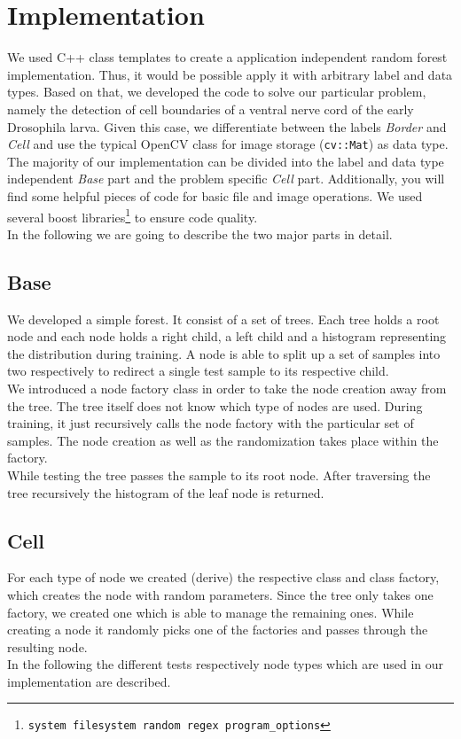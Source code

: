 \section{Implementation}
\label{sec:implementation}


We used C++ class templates to create a application independent random forest implementation. Thus, it would be possible apply it with arbitrary label and data types. Based on that, we developed the code to solve our particular problem, namely the detection of cell boundaries of a ventral nerve cord of the early Drosophila larva. Given this case, we differentiate between the labels \emph{Border} and \emph{Cell} and use the typical OpenCV class for image storage (\texttt{cv::Mat}) as data type.\\
The majority of our implementation can be divided into the label and data type independent \emph{Base} part and the problem specific \emph{Cell} part. Additionally, you will find some helpful pieces of code for basic file and image operations. We used several boost libraries\footnote{\texttt{system filesystem random regex program\_options}} to ensure code quality.\\
In the following we are going to describe the two major parts in detail.

\subsection{Base}
\label{subsec:base}
We developed a simple forest. It consist of a set of trees. Each tree holds a root node and each node holds a right child, a left child and a histogram representing the distribution during training. A node is able to split up a set of samples into two respectively to redirect a single test sample to its respective child. \\
We introduced a node factory class in order to take the node creation away from the tree. The tree itself does not know which type of nodes are used. During training, it just recursively calls the node factory with the particular set of samples. The node creation as well as the randomization takes place within the factory. \\
While testing the tree passes the sample to its root node. After traversing the tree recursively the histogram of the leaf node is returned. 

\subsection{Cell}
\label{subsec:base}
For each type of node we created (derive) the respective class and class factory, which creates the node with random parameters. Since the tree only takes one factory, we created one which is able to manage the remaining ones. While creating a node it randomly picks one of the factories and passes through the resulting node.\\
In the following the different tests respectively node types which are used in our implementation are described.


